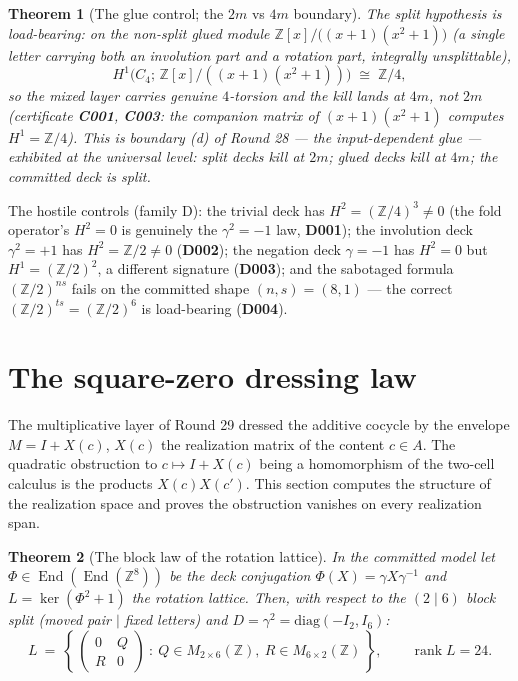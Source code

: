 \documentclass[11pt]{article}
\newcommand{\Z}{\mathbb Z}
\newcommand{\End}{\operatorname{End}}
\newtheorem{theorem}{Theorem}[section]
\begin{document}
\begin{theorem}[The glue control; the $2m$ vs $4m$ boundary]
\label{thm:glue}
The split hypothesis is load-bearing: on the non-split glued module
$\Z[x]/\bigl((x+1)(x^2+1)\bigr)$ (a single letter carrying both an
involution part and a rotation part, integrally unsplittable),
\[
H^1\bigl(C_4;\,\Z[x]/((x+1)(x^2+1))\bigr)\;\cong\;\Z/4,
\]
so the mixed layer carries genuine $4$-torsion and the kill lands at
$4m$, not $2m$ (certificate \textbf{C001}, \textbf{C003}: the
companion matrix of $(x+1)(x^2+1)$ computes $H^1=\Z/4$). This is
boundary (d) of Round 28 --- the input-dependent glue --- exhibited at
the universal level: \emph{split decks kill at $2m$; glued decks kill
at $4m$; the committed deck is split.}
\end{theorem}

The hostile controls (family D): the trivial deck has
$H^2=(\Z/4)^3\ne0$ (the fold operator's $H^2=0$ is genuinely the
$\gamma^2=-1$ law, \textbf{D001}); the involution deck
$\gamma^2=+1$ has $H^2=\Z/2\ne0$ (\textbf{D002}); the negation deck
$\gamma=-1$ has $H^2=0$ but $H^1=(\Z/2)^2$, a different signature
(\textbf{D003}); and the sabotaged formula $(\Z/2)^{ns}$ fails on the
committed shape $(n,s)=(8,1)$ --- the correct $(\Z/2)^{ts}=(\Z/2)^6$
is load-bearing (\textbf{D004}).

\section{The square-zero dressing law}\label{sec:square-zero}

The multiplicative layer of Round 29 dressed the additive cocycle by
the envelope $M=I+X(c)$, $X(c)$ the realization matrix of the content
$c\in A$. The quadratic obstruction to
$c\mapsto I+X(c)$ being a homomorphism of the two-cell calculus is
the products $X(c)X(c')$. This section computes the structure of the
realization space and proves the obstruction vanishes on every
realization span.

\begin{theorem}[The block law of the rotation lattice]\label{thm:block}
In the committed model let
$\Phi\in\End(\End(\Z^8))$ be the deck conjugation
$\Phi(X)=\gamma X\gamma^{-1}$ and
$L=\ker(\Phi^2+1)$ the rotation lattice. Then, with respect to the
$(2\mid6)$ block split (moved pair $\mid$ fixed letters) and
$D=\gamma^2=\mathrm{diag}(-I_2,I_6)$:
\[
L\ =\ \left\{\,\begin{pmatrix}0&Q\\ R&0\end{pmatrix}\ :\ 
Q\in M_{2\times6}(\Z),\ R\in M_{6\times2}(\Z)\,\right\},
\qquad \operatorname{rank}L=24.
\]
\end{theorem}
\end{document}
